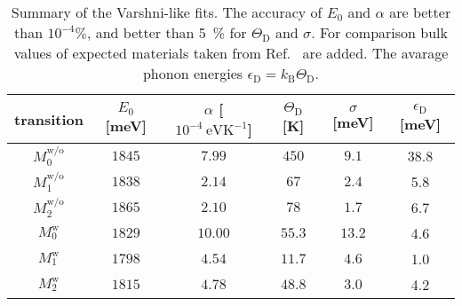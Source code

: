 

\begin{table}
	\centering
	\caption{Summary of the Varshni-like fits. The accuracy of $E_0$ and $\alpha$ are better than $10^{-4}\%$, and better than 5~\% for $\Theta_\mathrm{D}$ and $\sigma$. For comparison bulk values of expected materials taken from Ref.~\cite{Vurgaftman} are added. The avarage phonon energies $\epsilon_\mathrm{D}=k_\mathrm{B}\Theta_\mathrm{D}$.}
	\begin{tabularx}{1\textwidth}{cccccc}
		\toprule
		
		transition & $E_0$ [meV]& $\alpha$ [$10^{-4}~\mathrm{eVK^{-1}}$]& $\Theta_\mathrm{D}$ [K]& $\sigma$ [meV]&  $\epsilon_\mathrm{D}$ [meV]\\ 	
		\midrule
		\midrule
		$M_0^\mathrm{w/o}$& $1845$ & $7.99$& $450$&$9.1$& 38.8\\
		$M_1^\mathrm{w/o}$& $1838$ & $2.14$& $67$&$2.4$&5.8\\
		$M_2^\mathrm{w/o}$ & $1865$ & $2.10$& $78$& $1.7$&6.7\\ 
		
		
		
		\midrule
		$M_0^\mathrm{w}$& $1829$ & $10.00$& $55.3$& $13.2$&4.6\\
		$M_1^\mathrm{w}$& $1798$ & $4.54$& $11.7$&$4.6$&1.0\\
		$M_2^\mathrm{w}$ & $1815$& $4.78$& $48.8$& $3.0$&4.2\\ 
		
		
		
		

\end{tabularx}
\end{table}
